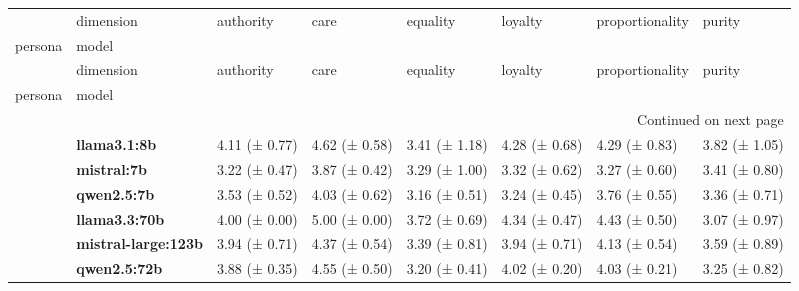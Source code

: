 \begin{longtable}{llllllll}
\toprule
 & dimension & authority & care & equality & loyalty & proportionality & purity \\
persona & model &  &  &  &  &  &  \\
\midrule
\endfirsthead
\toprule
 & dimension & authority & care & equality & loyalty & proportionality & purity \\
persona & model &  &  &  &  &  &  \\
\midrule
\endhead
\midrule
\multicolumn{8}{r}{Continued on next page} \\
\midrule
\endfoot
\bottomrule
\endlastfoot
\multirow[t]{6}{*}{\textbf{base}} & \textbf{llama3.1:8b} & 4.11 (± 0.77) & 4.62 (± 0.58) & 3.41 (± 1.18) & 4.28 (± 0.68) & 4.29 (± 0.83) & 3.82 (± 1.05) \\
\textbf{} & \textbf{mistral:7b} & 3.22 (± 0.47) & 3.87 (± 0.42) & 3.29 (± 1.00) & 3.32 (± 0.62) & 3.27 (± 0.60) & 3.41 (± 0.80) \\
\textbf{} & \textbf{qwen2.5:7b} & 3.53 (± 0.52) & 4.03 (± 0.62) & 3.16 (± 0.51) & 3.24 (± 0.45) & 3.76 (± 0.55) & 3.36 (± 0.71) \\
\textbf{} & \textbf{llama3.3:70b} & 4.00 (± 0.00) & 5.00 (± 0.00) & 3.72 (± 0.69) & 4.34 (± 0.47) & 4.43 (± 0.50) & 3.07 (± 0.97) \\
\textbf{} & \textbf{mistral-large:123b} & 3.94 (± 0.71) & 4.37 (± 0.54) & 3.39 (± 0.81) & 3.94 (± 0.71) & 4.13 (± 0.54) & 3.59 (± 0.89) \\
\textbf{} & \textbf{qwen2.5:72b} & 3.88 (± 0.35) & 4.55 (± 0.50) & 3.20 (± 0.41) & 4.02 (± 0.20) & 4.03 (± 0.21) & 3.25 (± 0.82) \\
\cline{1-8}
\end{longtable}
